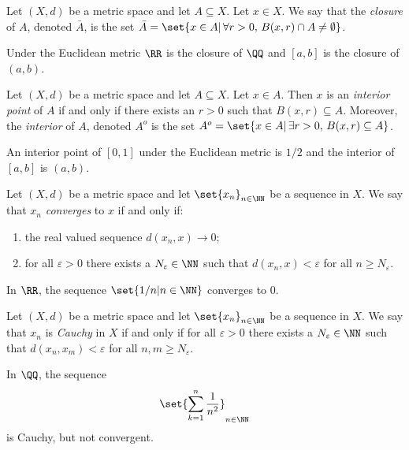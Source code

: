 \begin{definition*}
	Let $(X,d)$ be a metric space and let $A\subseteq X$.
	Let $x\in X$.
	We say that the \textit{closure} of $A$, denoted $\bar{A}$, is the set $\bar{A}=\set{x\in A|\,\forall r>0,\, B(x,r)\cap A\neq\emptyset}$.
\end{definition*}
\begin{example*}
	Under the Euclidean metric $\RR$ is the closure of $\QQ$ and $[a,b]$ is the closure of $(a,b)$.
\end{example*}

\begin{definition*}
	Let $(X,d)$ be a metric space and let $A\subseteq X$.
	Let $x\in A$.
	Then $x$ is an \textit{interior point} of $A$ if and only if there exists an $r>0$ such that $B(x,r)\subseteq A$.
	Moreover, the \textit{interior} of $A$, denoted $A^o$ is the set $A^o=\set{x\in A|\,\exists r>0,\, B(x,r)\subseteq A}$.
\end{definition*}
\begin{example*}
	An interior point of $[0,1]$ under the Euclidean metric is $1/2$ and the interior of $[a,b]$ is $(a,b)$.
\end{example*}

\begin{definition*}
	Let $(X,d)$ be a metric space and let $\set{x_n}_{n\in\NN}$ be a sequence in $X$.
	We say that $x_n$ \textit{converges} to $x$ if and only if:
	\begin{enumerate}
		\item the real valued sequence $d(x_n,x)\rightarrow 0$;
		\item for all $\varepsilon >0$ there exists a $N_\varepsilon\in\NN$ such that $d(x_n,x)<\varepsilon$ for all $n\geq N_\varepsilon$.
	\end{enumerate}
\end{definition*}
\begin{example*}
	In $\RR$, the sequence $\set{1/n | n\in\NN}$ converges to 0.
\end{example*}

\begin{definition*}
	Let $(X,d)$ be a metric space and let $\set{x_n}_{n\in\NN}$ be a sequence in $X$.
	We say that $x_n$ is \textit{Cauchy} in $X$ if and only if for all $\varepsilon>0$ there exists a $N_\varepsilon\in\NN$ such that $d(x_n,x_m)<\varepsilon$ for all $n,m\geq N_\varepsilon$.
\end{definition*}
\begin{example*}
	In $\QQ$, the sequence
	\[
		\set{\sum_{k=1}^n \frac{1}{n^2}}_{n\in\NN}
	\]
	is Cauchy, but not convergent.
\end{example*}

